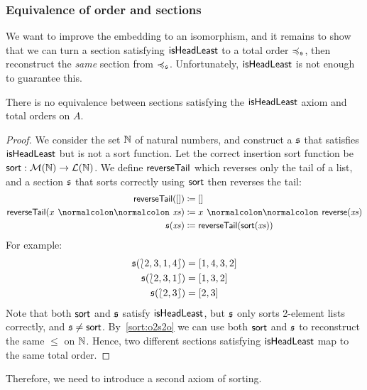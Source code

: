 \subsubsection{Equivalence of order and sections}

We want to improve the embedding to an isomorphism, and it
remains to show that we can turn a section satisfying $\operatorname{\mathsf{isHeadLeast}}$ to a total order $\preccurlyeq_{\mathfrak{s}}$,
then reconstruct the \emph{same} section from $\preccurlyeq_{\mathfrak{s}}$.
Unfortunately, $\operatorname{\mathsf{isHeadLeast}}$ is not enough to guarantee this.
\begin{proposition}
    \label{prop:counterexample-equivalence}
    There is no equivalence between sections satisfying the $\operatorname{\mathsf{isHeadLeast}}$ axiom and total orders on $A$.
\end{proposition}
\begin{proof}
    We consider the set $\mathbb{N}$ of natural numbers,
    and construct a $\mathfrak{s}$ that satisfies $\operatorname{\mathsf{isHeadLeast}}$ but is not a sort function.
    Let the correct insertion sort function be $\operatorname{\mathsf{sort}} : \mathcal{M}(\mathbb{N}) \to \mathcal{L}(\mathbb{N})$.
    We define $\operatorname{\mathsf{reverseTail}}$ which reverses only the tail of a list,
    and a section $\mathfrak{s}$ that sorts correctly using $\operatorname{\mathsf{sort}}$ then reverses the tail:
    \begin{align*}
        \term{reverseTail}([])          & \defeq []                                   \\
        \term{reverseTail}(x \cons \xs) & \defeq x \cons \term{reverse}(\xs)          \\
        \ssection(\xs)                  & \defeq \term{reverseTail}(\term{sort}(\xs))
    \end{align*}
    For example:
    \begin{align*}
        \mathfrak{s}({\lbag}{2,3,1,4}{\rbag}) & = [1,4,3,2] \\
        \mathfrak{s}({\lbag}{2,3,1}{\rbag})   & = [1, 3, 2] \\
        \mathfrak{s}({\lbag}{2,3}{\rbag})     & = [2, 3]
    \end{align*}
    Note that both $\operatorname{\mathsf{sort}}$ and $\mathfrak{s}$ satisfy $\operatorname{\mathsf{isHeadLeast}}$,
    but $\mathfrak{s}$ only sorts 2-element lists correctly, and $\mathfrak{s} \neq \operatorname{\mathsf{sort}}$.
    By~\cref{sort:o2s2o} we can use both $\operatorname{\mathsf{sort}}$ and $\mathfrak{s}$
    to reconstruct the same $\leq$ on $\mathbb{N}$.
    Hence, two different sections satisfying $\operatorname{\mathsf{isHeadLeast}}$ map to the same total order.
\end{proof}
%
Therefore, we need to introduce a second axiom of sorting.

